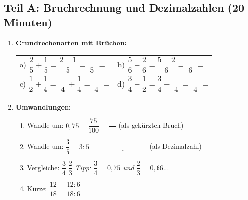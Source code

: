 \subsection*{Teil A: Bruchrechnung und Dezimalzahlen (20 Minuten)}

\begin{enumerate}[label=\arabic*.]
    \item \textbf{Grundrechenarten mit Brüchen:}
    \vspace{0.5cm}

    \begin{tabular}{ll}
        a) $\dfrac{2}{5} + \dfrac{1}{5} = \dfrac{2+1}{5} = \dfrac{\phantom{00}}{5}$ = \underline{\hspace{3cm}} &
        b) $\dfrac{5}{6} - \dfrac{2}{6} = \dfrac{5-2}{6} = \dfrac{\phantom{00}}{6}$ = \underline{\hspace{3cm}} \\[4ex]
        c) $\dfrac{1}{2} + \dfrac{1}{4} = \dfrac{\phantom{00}}{4} + \dfrac{1}{4} = \dfrac{\phantom{00}}{4}$ = \underline{\hspace{3cm}} &
        d) $\dfrac{3}{4} - \dfrac{1}{2} = \dfrac{3}{4} - \dfrac{\phantom{00}}{4} = \dfrac{\phantom{00}}{4}$ = \underline{\hspace{3cm}}
    \end{tabular}

    \vspace{1cm}

    \item \textbf{Umwandlungen:}
    \vspace{0.5cm}

    \begin{enumerate}[label=\alph*)]
        \item Wandle um: $0{,}75 = \dfrac{75}{100} = \dfrac{\phantom{00}}{\phantom{00}}$ (als gekürzten Bruch)

        \vspace{0.5cm}

        \item Wandle um: $\dfrac{3}{5} = 3 : 5 = \underline{\hspace{3cm}}$ (als Dezimalzahl)

        \vspace{0.5cm}

        \item Vergleiche: $\dfrac{3}{4}$ \underline{\hspace{1cm}} $\dfrac{2}{3}$
        \textit{Tipp: $\dfrac{3}{4} = 0{,}75$ und $\dfrac{2}{3} = 0{,}66...$}

        \vspace{0.5cm}

        \item Kürze: $\dfrac{12}{18} = \dfrac{12:6}{18:6} = \dfrac{\phantom{00}}{\phantom{00}}$
    \end{enumerate}
\end{enumerate}